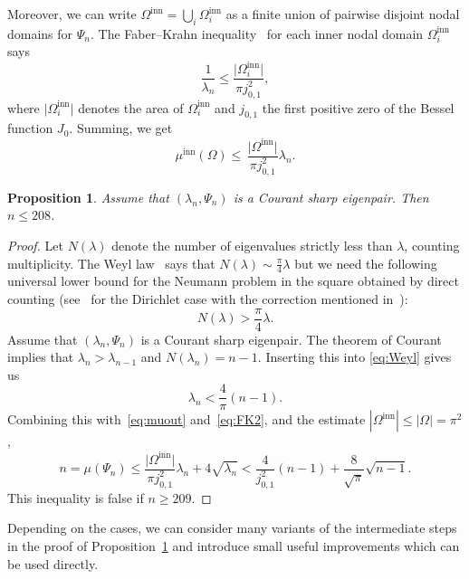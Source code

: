 \documentclass[a4paper,reqno,11pt]{amsart}
\newtheorem{prop}[thm]{Proposition}
\theoremstyle{remark}
\theoremstyle{definition}
\numberwithin{equation}{section}
\begin{document}
Moreover, we can write $\Omega^{\text{inn}}=\bigcup_i \Omega^{\text{inn}}_{i}$ 
as a finite union of pairwise disjoint nodal domains for $\Psi_n$. 
The Faber--Krahn inequality~\cite{F,K}
for each inner nodal domain $\Omega^{\text{inn}}_{i}$ says
\begin{equation}
\label{eq:FK}
\frac{1}{\lambda_n}
\leq
\frac{\bigl|\Omega^{\text{inn}}_i\bigr|}{\pi j_{0,1}^2},
\end{equation}
where $\bigl|\Omega^{\text{inn}}_i\bigr|$ denotes the area of 
$\Omega^{\text{inn}}_i$ and $j_{0,1}$ the first positive zero of the Bessel
function $J_0$. Summing, we get
\begin{equation}
\label{eq:FK2}
\mu^{\text{inn}}(\Omega) 
\leq \,  \frac{\bigl|\Omega^{\text{inn}}\bigr|}{\pi j_{0,1}^2}\lambda_n.
\end{equation}

\begin{prop}
\label{prop:red1}
Assume that $(\lambda_n,\Psi_n)$ is a Courant sharp eigenpair. Then $n\leq 208$.
\end{prop}

\begin{proof}
Let $N(\lambda)$ denote the number of eigenvalues strictly less than 
$\lambda$, counting multiplicity. The Weyl law~\cite{W}  says 
that $N(\lambda)\sim \frac{\pi}{4}\lambda$ but we need the following universal 
lower bound for the Neumann problem in the square obtained by direct counting 
(see~\cite{Pl} for the Dirichlet case with the correction mentioned 
in~\cite{BH}):
\begin{equation}
\label{eq:Weyl}
N(\lambda)>\frac{\pi}{4}\lambda.
\end{equation}
Assume that $(\lambda_n,\Psi_n)$ is a Courant sharp eigenpair. The theorem 
of Courant implies that $\lambda_n>\lambda_{n-1}$ and $N(\lambda_n)=n-1$.
Inserting this into \eqref{eq:Weyl} gives us
\[
\lambda_n<\frac{4}{\pi}(n-1).
\]
Combining this with~\eqref{eq:muout} and~\eqref{eq:FK2}, and the
estimate $|\Omega^{\text{inn}}|\leq|\Omega|=\pi^2$,
\[
n=\mu(\Psi_n) \leq \frac{\bigl|\Omega^{\text{inn}}\bigr|}{\pi j_{0,1}^2}\lambda_n + 4\sqrt{\lambda_n}
 < \frac{4}{j_{0,1}^2}(n-1)+\frac{8}{\sqrt{\pi}}\sqrt{n-1}.
\]
 This inequality is false if $n\geq 209$.
\end{proof}

Depending on the cases, we can consider many variants of the  intermediate 
steps in the proof of Proposition~\ref{prop:red1} and introduce small useful 
improvements which can be used directly.
\end{document}
